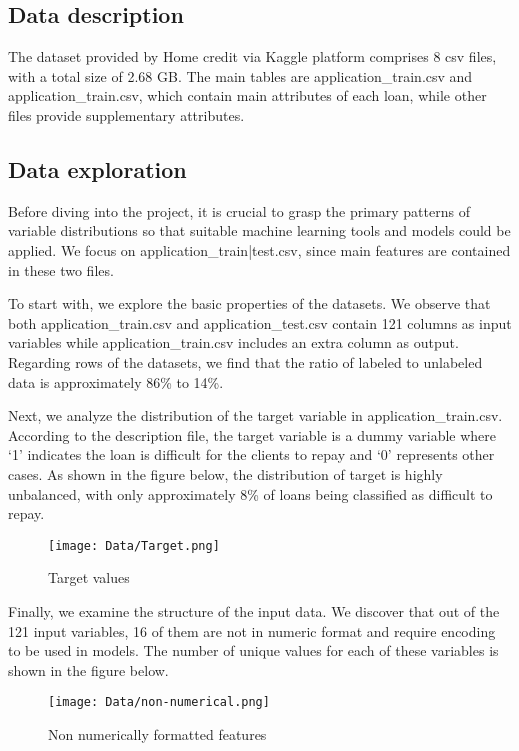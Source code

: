 \documentclass{article}
\begin{document}
\subsection{Data description}

 The dataset provided by Home credit via Kaggle platform comprises 8 csv files, with a total size of 2.68 GB. The main tables are application\_train.csv and application\_train.csv, which contain main attributes of each loan, while other files provide supplementary attributes.


\subsection{Data exploration}
Before diving into the project, it is crucial to grasp the primary patterns of variable distributions so that suitable machine learning tools and models could be applied. We focus on application\_{train|test}.csv, since main features are contained in these two files.

To start with, we explore the basic properties of the datasets. We observe that both application\_train.csv and application\_test.csv contain 121 columns as input variables while application\_train.csv includes an extra column as output. Regarding rows of the datasets, we find that the ratio of labeled to unlabeled data is approximately 86\% to 14\%. 

Next, we analyze the distribution of the target variable in application\_train.csv. According to the description file, the target variable is a dummy variable where ‘1’ indicates the loan is difficult for the clients to repay and ‘0’ represents other cases. As shown in the figure below, the distribution of target is highly unbalanced, with only approximately 8\% of loans being classified as difficult to repay. 

\begin{figure}[H]
  \centering
  \texttt{[image: Data/Target.png]}
  \caption{Target values}
\end{figure}

Finally, we examine the structure of the input data. We discover that out of the 121 input variables, 16 of them are not in numeric format and require encoding to be used in models. The number of unique values for each of these variables is shown in the figure below.

\begin{figure}[H]
  \centering
  \texttt{[image: Data/non-numerical.png]}
  \caption{Non numerically formatted features}
\end{figure}
\end{document}
